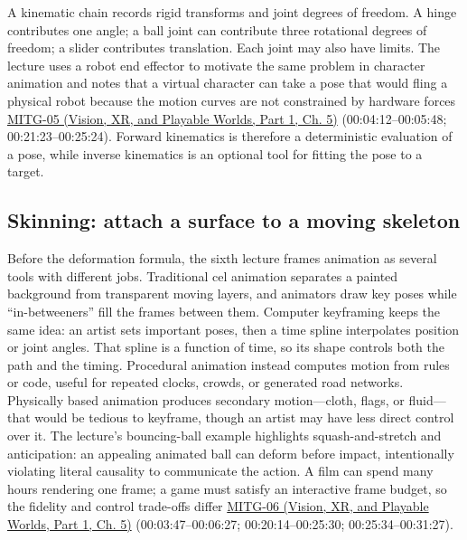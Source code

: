 A kinematic chain records rigid transforms and joint degrees of freedom. A hinge contributes one angle; a ball joint can contribute three rotational degrees of freedom; a slider contributes translation. Each joint may also have limits. The lecture uses a robot end effector to motivate the same problem in character animation and notes that a virtual character can take a pose that would fling a physical robot because the motion curves are not constrained by hardware forces \href{../07-Vision-XR-and-Playable-Worlds-P01/main.pdf\#nameddest=04-visual-computing-ii-ch036-mitg-05---hierarchical-modeling}{MITG-05 (Vision, XR, and Playable Worlds, Part 1, Ch. 5)} (00:04:12--00:05:48; 00:21:23--00:25:24). Forward kinematics is therefore a deterministic evaluation of a pose, while inverse kinematics is an optional tool for fitting the pose to a target.

\subsection{Skinning: attach a surface to a moving skeleton}\label{04-visual-computing-ii-ch029-skinning-attach-a-surface-to-a-moving-skeleton}

\hypertarget{04-visual-computing-ii-ch029-skinning-attach-a-surface-to-a-moving-skeleton}{}

Before the deformation formula, the sixth lecture frames animation as several tools with different jobs. Traditional cel animation separates a painted background from transparent moving layers, and animators draw key poses while ``in-betweeners'' fill the frames between them. Computer keyframing keeps the same idea: an artist sets important poses, then a time spline interpolates position or joint angles. That spline is a function of time, so its shape controls both the path and the timing. Procedural animation instead computes motion from rules or code, useful for repeated clocks, crowds, or generated road networks. Physically based animation produces secondary motion---cloth, flags, or fluid---that would be tedious to keyframe, though an artist may have less direct control over it. The lecture's bouncing-ball example highlights squash-and-stretch and anticipation: an appealing animated ball can deform before impact, intentionally violating literal causality to communicate the action. A film can spend many hours rendering one frame; a game must satisfy an interactive frame budget, so the fidelity and control trade-offs differ \href{../07-Vision-XR-and-Playable-Worlds-P01/main.pdf\#nameddest=04-visual-computing-ii-ch036-mitg-06---animation-skinningenveloping}{MITG-06 (Vision, XR, and Playable Worlds, Part 1, Ch. 5)} (00:03:47--00:06:27; 00:20:14--00:25:30; 00:25:34--00:31:27).

